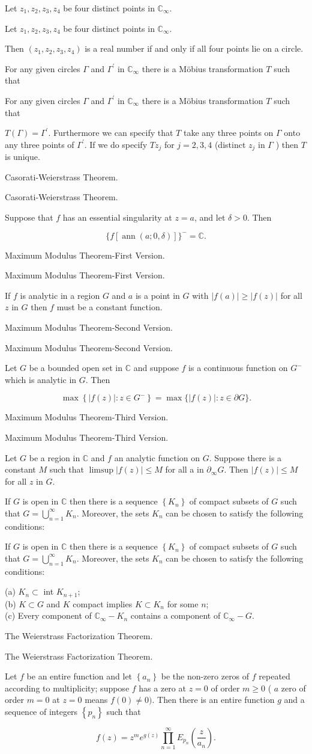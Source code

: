 \documentclass[17pt]{extarticle}
\newcommand{\boxset}[2]{\begin{mdframed}[style=darkQuesion]
#1
\end{mdframed}
\newpage
\begin{mdframed}[style=darkQuesion]
#1
  \end{mdframed}
\begin{mdframed}[style=darkAnswer]
#2
  \end{mdframed}
  \newpage
}
\begin{document}
\boxset{Let $z_{1}, z_{2}, z_{3}, z_{4}$ be four distinct points in $\mathbb{C}_{\infty}$.}
{Then $\left(z_{1}, z_{2}, z_{3}, z_{4}\right)$ is a real number if and only if all four points lie on a circle.}


\boxset{For any given circles $\Gamma$ and $\Gamma^{\prime}$ in $\mathbb{C}_{\infty}$ there is a Möbius transformation $T$ such that}
{$T(\Gamma)=\Gamma^{\prime}$. Furthermore we can specify that $T$ take any three points on $\Gamma$ onto any three points of $\Gamma^{\prime}$. If we do specify $T z_{j}$ for $j=2,3,4$ (distinct $z_{j}$ in $\Gamma$ ) then $T$ is unique.}

\boxset{Casorati-Weierstrass Theorem.}
{Suppose that $f$ has an essential singularity at $z=a$, and let $\delta>0$. Then

\[
\{f[\operatorname{ann}(a ; 0, \delta)]\}^{-}=\mathbb{C} .
\]

}

\boxset{Maximum Modulus Theorem-First Version.}
{If $f$ is analytic in a region $G$ and $a$ is a point in $G$ with $|f(a)| \geq|f(z)|$ for all $z$ in $G$ then $f$ must be a constant function.}

\boxset{Maximum Modulus Theorem-Second Version.}
{Let $G$ be a bounded open set in $\mathbb{C}$ and suppose $f$ is a continuous function on $G^{-}$which is analytic in $G$. Then

\[
\max \left\{|f(z)|: z \in G^{-}\right\}=\max \{|f(z)|: z \in \partial G\} .
\]

}

\boxset{Maximum Modulus Theorem-Third Version.}
{Let $G$ be a region in $\mathbb{C}$ and $f$ an analytic function on $G$. Suppose there is a constant $M$ such that $\limsup |f(z)| \leq M$ for all a in $\partial_{\infty} G$. Then $|f(z)| \leq M$ for all $z$ in $G$.}

\boxset{If $G$ is open in $\mathbb{C}$ then there is a sequence $\left\{K_{n}\right\}$ of compact subsets of $G$ such that $G=\bigcup_{n=1}^{\infty} K_{n}$. Moreover, the sets $K_{n}$ can be chosen to satisfy the following conditions:}
{
(a) $K_{n} \subset$ int $K_{n+1}$;\[\ \]
(b) $K \subset G$ and $K$ compact implies $K \subset K_{n}$ for some $n$;\[\ \]
(c) Every component of $\mathbb{C}_{\infty}-K_{n}$ contains a component of $\mathbb{C}_{\infty}-G$.
}

\boxset{The Weierstrass Factorization Theorem.}
{Let $f$ be an entire function and let $\left\{a_{n}\right\}$ be the non-zero zeros of $f$ repeated according to multiplicity; suppose $f$ has a zero at $z=0$ of order $m \geqslant 0$ ( $a$ zero of order $m=0$ at $z=0$ means $f(0) \neq 0)$. Then there is an entire function $g$ and a sequence of integers $\left\{p_{n}\right\}$ such that


\[
f(z)=z^{m} e^{g(z)} \prod_{n=1}^{\infty} E_{p_{n}}\left(\frac{z}{a_{n}}\right) .
\]

}
\end{document}
